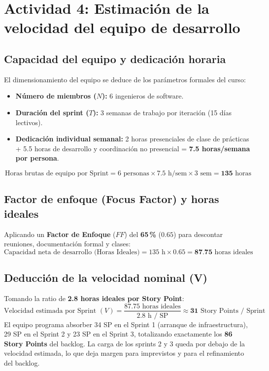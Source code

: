 \documentclass[11pt,a4paper]{article}
\newcommand{\hl}[1]{\textcolor{gblue}{\textbf{#1}}}
\begin{document}
\section{Actividad 4: Estimación de la velocidad del equipo de desarrollo}
\subsection{Capacidad del equipo y dedicación horaria}
El dimensionamiento del equipo se deduce de los parámetros formales del curso:

\begin{itemize}
\item \textbf{Número de miembros ($N$):} 6 ingenieros de software.
\item \textbf{Duración del sprint ($T$):} 3 semanas de trabajo por iteración (15 días lectivos).
\item \textbf{Dedicación individual semanal:} 2 horas presenciales de clase de prácticas + 5.5 horas de desarrollo y coordinación no presencial = \textbf{7.5 horas/semana por persona}.
\end{itemize}
\[\text{Horas brutas de equipo por Sprint} = 6 \text{ personas} \times 7.5 \text{ h/sem} \times 3 \text{ sem} = \textbf{135}\text{ horas}\]

\subsection{Factor de enfoque (Focus Factor) y horas ideales}
Aplicando un \textbf{Factor de Enfoque} ($FF$) del \hl{65\,\%} ($0.65$) para descontar reuniones, documentación formal y clases:
\[\text{Capacidad neta de desarrollo (Horas Ideales)} = 135 \text{ h} \times 0.65 = \textbf{87.75}\text{ horas ideales}\]

\subsection{Deducción de la velocidad nominal (V)}
Tomando la ratio de \textbf{2.8 horas ideales por Story Point}:
\[\text{Velocidad estimada por Sprint } (V) = \frac{87.75 \text{ horas ideales}}{2.8 \text{ h / SP}} \approx \textbf{31}\text{ Story Points / Sprint}\]
El equipo programa absorber 34 SP en el Sprint 1 (arranque de infraestructura), 29 SP en el Sprint 2 y 23 SP en el Sprint 3, totalizando exactamente los \hl{86 Story Points} del backlog. La carga de los sprints 2 y 3 queda por debajo de la velocidad estimada, lo que deja margen para imprevistos y para el refinamiento del backlog.
\end{document}
